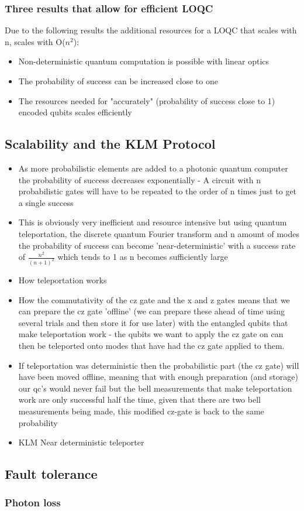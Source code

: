\subsubsection{Three results that allow for efficient LOQC}
Due to the following results the additional resources for a LOQC that scales with n, scales with O($n^2$):
\begin{itemize}
    \item Non-deterministic quantum computation is possible with linear optics
    \item The probability of success can be increased close to one
    \item The resources needed for "accurately" (probability of success close to 1) encoded qubits scales efficiently  
\end{itemize}

\subsection{Scalability and the KLM Protocol}
\begin{itemize}
    \item As more probabilistic elements are added to a photonic quantum computer the probability of success decreases exponentially - A circuit with n probabilistic gates will have to be repeated to the order of n times just to get a single success
    \item This is obviously very inefficient and resource intensive but using quantum teleportation, the discrete quantum Fourier transform and n amount of modes the probability of success can become 'near-deterministic' with a success rate of $\frac{n^2}{(n+1)^2}$ which tends to 1 as n becomes sufficiently large
    \item How teleportation works
    \item How the commutativity of the cz gate and the x and z gates means that we can prepare the cz gate 'offline' (we can prepare these ahead of time using several trials and then store it for use later) with the entangled qubits that make teleportation work - the qubits we want to apply the cz gate on can then be teleported onto modes that have had the cz gate applied to them.
    \item If teleportation was deterministic then the probabilistic part (the cz gate) will have been moved offline, meaning that with enough preparation (and storage) our qc's would never fail but the bell measurements that make teleportation work are only successful half the time, given that there are two bell measurements being made, this modified cz-gate is back to the same probability
    \item KLM Near deterministic teleporter
\end{itemize}
\subsection{Fault tolerance}
\subsubsection{Photon loss}